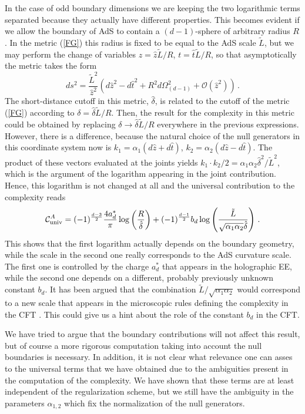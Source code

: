 \documentclass[11pt,letterpaper]{article}
\begin{document}
In the case of odd boundary dimensions we are keeping the two logarithmic terms separated because they actually have different properties. This becomes evident if we allow the boundary of AdS to contain a $(d-1)$-sphere of arbitrary radius $R$. In the metric (\ref{FG}) this radius is fixed to be equal to the AdS scale $\tilde L$, but we may perform the change of variables $z=\hat z \tilde L/R$, $t=\hat t \tilde L/ R$, so that asymptotically the metric takes the form
\begin{equation}\label{GAdS2}
ds^2=\frac{\tilde L^2}{\hat z^2}\left(d\hat z^2-d\hat t^2+R^2d\Omega_{(d-1)}^2+\mathcal{O}(\hat z^2)\right)\, .
\end{equation}
The short-distance cutoff in this metric, $\hat\delta$, is related to the cutoff of the metric (\ref{FG}) according to $\delta=\hat\delta \tilde L/R$. Then, the result for the complexity in this metric could be obtained by replacing $\delta\rightarrow \hat \delta \tilde L/R$ everywhere in the previous expressions. However, there is a difference, because the natural choice of the null generators in this coordinate system now is $k_1=\alpha_1(d\hat z+d\hat t)$, $k_2=\alpha_2 (d\hat z-d\hat t)$. The product of these vectors evaluated at the joints yields $k_1\cdot k_2/2=\alpha_1\alpha_2 \hat\delta^2/\tilde L^2$, which is the argument of the logarithm appearing in the joint contribution. Hence, this logarithm is not changed at all and the universal contribution to the complexity reads
\begin{equation}\label{CAuniv3}
\mathcal{C}^A_{\rm univ}=
(-1)^{\frac{d-3}{2}}\frac{4a_d^*}{\pi}\log\left(\frac{R}{\hat\delta}\right)+(-1)^{\frac{d-1}{2}}b_d \log\left(\frac{\tilde L}{\sqrt{\alpha_1\alpha_2}\hat\delta}\right)\, .
\end{equation}
This shows that the first logarithm actually depends on the boundary geometry, while the scale in the second one really corresponds to the AdS curvature scale. The first one is controlled by the charge $a^*_d$ that appears in the holographic EE, while the second one depends on a different, probably previously unknown constant $b_d$. It has been argued that the combination $\tilde L/\sqrt{\alpha_1\alpha_2}$ would correspond to a new scale that appears in the microscopic rules defining the complexity in the CFT \cite{Jefferson:2017sdb,Carmi:2016wjl}.  This could give us a hint about the role of the constant $b_d$ in the CFT.

We have tried to argue that the boundary contributions will not affect this result, but of course a more rigorous computation taking into account the null boundaries is necessary. In addition, it is not clear what relevance one can asses to the universal terms that we have obtained due to the ambiguities present in the computation of the complexity. We have shown that these terms are at least independent of the regularization scheme,  but we still have the ambiguity in the parameters $\alpha_{1,2}$ which fix the normalization of the null generators.
\end{document}
